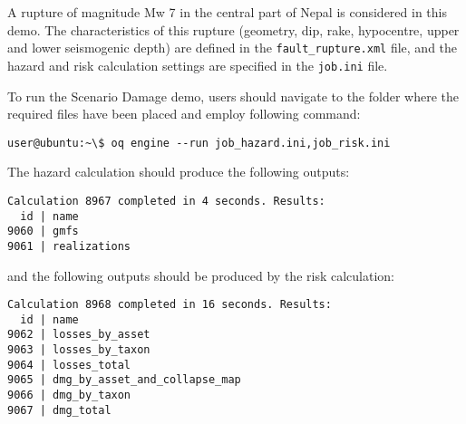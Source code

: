 A rupture of magnitude Mw 7 in the central part of Nepal is considered in this
demo. The characteristics of this rupture (geometry, dip, rake, hypocentre,
upper and lower seismogenic depth) are defined in the \verb+fault_rupture.xml+
file, and the hazard and risk calculation settings are specified in the
\verb+job.ini+ file.

To run the Scenario Damage demo, users should navigate to the folder where the
required files have been placed and employ following command:

\begin{verbatim}
user@ubuntu:~\$ oq engine --run job_hazard.ini,job_risk.ini
\end{verbatim}

The hazard calculation should produce the following outputs:

\begin{verbatim}
Calculation 8967 completed in 4 seconds. Results:
  id | name
9060 | gmfs
9061 | realizations
\end{verbatim}

and the following outputs should be produced by the risk calculation:

\begin{verbatim}
Calculation 8968 completed in 16 seconds. Results:
  id | name
9062 | losses_by_asset
9063 | losses_by_taxon
9064 | losses_total
9065 | dmg_by_asset_and_collapse_map
9066 | dmg_by_taxon
9067 | dmg_total
\end{verbatim}
